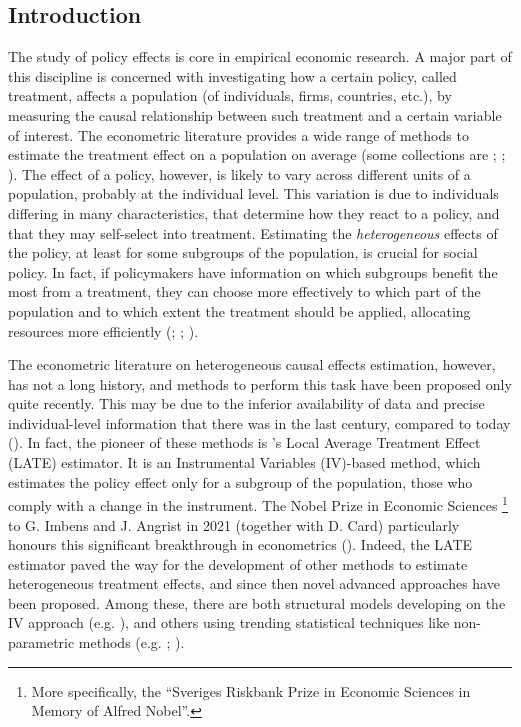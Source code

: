 \documentclass[12pt,a4paper,openright,twoside]{book}
\begin{document}
\clearpage
{}
\setcounter{page}{1}
\begin{doublespacing}
\chapter*{Introduction}

The study of policy effects is core in empirical economic research. A major part of this discipline is concerned with investigating how a certain policy, called treatment, affects a population (of individuals, firms, countries, etc.), by measuring the causal relationship between such treatment and a certain variable of interest. The econometric literature provides a wide range of methods to estimate the treatment effect on a population on average (some collections are \citealp{angrist2009mostly}; \citealp{imbensrubin2015}; \citealp{hernanrobins2023}). The effect of a policy, however, is likely to vary across different units of a population, probably at the individual level. This variation is due to individuals differing in many characteristics, that determine how they react to a policy, and that they may self-select into treatment. Estimating the \textit{heterogeneous} effects of the policy, at least for some subgroups of the population, is crucial for social policy. In fact, if policymakers have information on which subgroups benefit the most from a treatment, they can choose more effectively to which part of the population and to which extent the treatment should be applied, allocating resources more efficiently (\citealp{heckman2005structural}; \citealp{xie2012estimating}; \citealp{zhouxie2020heterogeneous}). 

The econometric literature on heterogeneous causal effects estimation, however, has not a long history, and methods to perform this task have been proposed only quite recently. This may be due to the inferior availability of data and precise individual-level information that there was in the last century, compared to today (\citealp{wagerathey2018}). 
In fact, the pioneer of these methods is \citet{imbensangrist1994}'s Local Average Treatment Effect (LATE) estimator. It is an Instrumental Variables (IV)-based method, which estimates the policy effect only for a subgroup of the population, those who comply with a change in the instrument.
The Nobel Prize in Economic Sciences \footnote{More specifically, the ``Sveriges Riskbank Prize in Economic Sciences in Memory of Alfred Nobel''.} to G. Imbens and J. Angrist in 2021 (together with D. Card) particularly honours this significant breakthrough in econometrics (\citealp{lechner2023}).
Indeed, the LATE estimator paved the way for the development of other methods to estimate heterogeneous treatment effects, and since then novel advanced approaches have been proposed. Among these, there are both structural models developing on the IV approach (e.g. \citealp{heckman2005structural}), and others using trending statistical techniques like non-parametric methods (e.g. \citealp{nie2021quasi}; \citealp{xie2012estimating}). 


\end{doublespacing}
\end{document}
